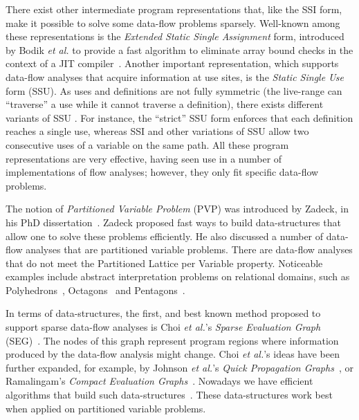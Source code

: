{There exist other intermediate program representations that, like the SSI form, make it possible to solve some data-flow problems sparsely.
Well-known among these representations is the {\em Extended Static Single Assignment} form, introduced by Bodik {\em et al.} to provide a fast algorithm to eliminate array bound checks in the context of a JIT compiler~\cite{Bodik00}.
Another important representation, which supports data-flow analyses that acquire information at use sites, is the \emph{Static Single Use} form (SSU).
As uses and definitions are not fully symmetric (the live-range can ``traverse'' a use while it cannot traverse a definition), there exists different variants of SSU \cite{Plevyak96,George03-IXP,Lo98_registerPromotion}.
For instance, the ``strict'' SSU form enforces that each definition reaches a
single use, whereas SSI and other variations of SSU allow two consecutive uses
of a variable on the same path.
All these program representations are very effective, having seen use in a number of implementations of flow analyses; however, they only fit specific data-flow problems.

The notion of {\em Partitioned Variable Problem} (PVP) was introduced by Zadeck, in his PhD dissertation~\cite{Zadeck84}.
Zadeck proposed fast ways to build data-structures that allow one to solve these problems efficiently.
He also discussed a number of data-flow analyses that are partitioned variable problems.
There are data-flow analyses that do not meet the Partitioned Lattice per Variable property.
Noticeable examples include abstract interpretation problems on relational domains, such as Polyhedrons~\cite{Cousot78}, Octagons~\cite{Mine06} and Pentagons~\cite{Logozzo08}.

In terms of data-structures, the first, and best known method proposed to support sparse data-flow analyses is Choi {\em et al.}'s {\em Sparse Evaluation Graph} (SEG)~\cite{Choi91}.
The nodes of this graph represent program regions where information produced by the data-flow analysis might change.
Choi {\em et al.}'s ideas have been further expanded, for example, by Johnson {\em et al.}'s {\em Quick Propagation Graphs}~\cite{Johnson93}, or Ramalingam's {\em Compact Evaluation Graphs}~\cite{Ramalingam02}.
Nowadays we have efficient algorithms that build such data-structures~\cite{Pingali95,Pingali97,Johnson94}.
These data-structures work best when applied on partitioned variable problems.

}

